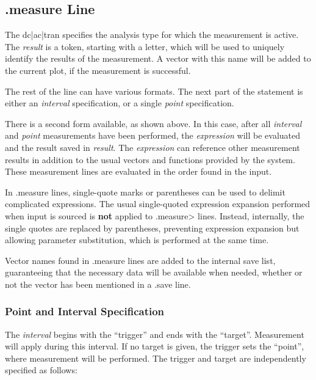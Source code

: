 \subsection{{\vt .measure} Line}


The {\vt dc|ac|tran} specifies the analysis type for which the
measurement is active.  The {\it result} is a token, starting with a
letter, which will be used to uniquely identify the results of the
measurement.  A vector with this name will be added to the current
plot, if the measurement is successful.

The rest of the line can have various formats.  The next part of the
statement is either an {\it interval} specification, or a single {\it
point} specification.

There is a second form available, as shown above.  In this case, after
all {\it interval} and {\it point} measurements have been performed,
the {\it expression} will be evaluated and the result saved in {\it
result}.  The {\it expression} can reference other measurement results
in addition to the usual vectors and functions provided by the system. 
These measurement lines are evaluated in the order found in the input.

In {\vt .measure} lines, single-quote marks or parentheses can be used
to delimit complicated expressions.  The usual single-quoted
expression expansion performed when input is sourced is {\bf not}
applied to {\vt .measure}> lines.  Instead, internally, the single
quotes are replaced by parentheses, preventing expression expansion
but allowing parameter substitution, which is performed at the same
time.

Vector names found in {\vt .measure} lines are added to the internal
save list, guaranteeing that the necessary data will be available when
needed, whether or not the vector has been mentioned in a {\vt .save}
line.

\subsubsection{Point and Interval Specification}

The {\it interval} begins with the ``trigger'' and ends with the
``target''.  Measurement will apply during this interval.  If no
target is given, the trigger sets the ``point'', where measurement
will be performed.  The trigger and target are independently specified
as follows:

